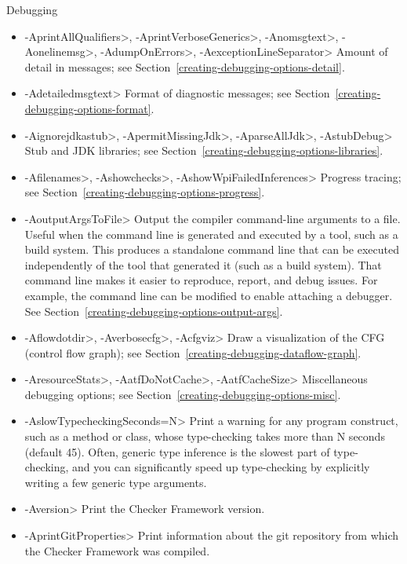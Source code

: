 Debugging
\begin{itemize}
\item
 \<-AprintAllQualifiers>,
 \<-AprintVerboseGenerics>,
 \<-Anomsgtext>,
 \<-Aonelinemsg>,
 \<-AdumpOnErrors>,
 \<-AexceptionLineSeparator>
Amount of detail in messages; see Section~\ref{creating-debugging-options-detail}.

\item
 \<-Adetailedmsgtext>
Format of diagnostic messages; see Section~\ref{creating-debugging-options-format}.

\item
 \<-Aignorejdkastub>,
 \<-ApermitMissingJdk>,
 \<-AparseAllJdk>,
 \<-AstubDebug>
Stub and JDK libraries; see Section~\ref{creating-debugging-options-libraries}.

\item
 \<-Afilenames>,
 \<-Ashowchecks>,
 \<-AshowWpiFailedInferences>
Progress tracing; see Section~\ref{creating-debugging-options-progress}.

\item
\<-AoutputArgsToFile>
Output the compiler command-line arguments to a file.  Useful when the
command line is generated and executed by a tool, such as a build system.
This produces a standalone command line that can be executed independently
of the tool that generated it (such as a build system).
That command line makes it easier to reproduce, report, and debug issues.
For example, the command line can be modified to enable attaching a debugger.
See Section~\ref{creating-debugging-options-output-args}.

\item
 \<-Aflowdotdir>,
 \<-Averbosecfg>,
 \<-Acfgviz>
 Draw a visualization of the CFG (control flow graph); see
 Section~\ref{creating-debugging-dataflow-graph}.

\item
 \<-AresourceStats>,
 \<-AatfDoNotCache>,
 \<-AatfCacheSize>
Miscellaneous debugging options; see Section~\ref{creating-debugging-options-misc}.

\item
 \<-AslowTypecheckingSeconds=N>
Print a warning for any program construct, such as a method or class, whose
type-checking takes more than N seconds (default 45).
Often, generic type inference is the slowest part of type-checking, and you
can significantly speed up type-checking by explicitly writing a few
generic type arguments.

\item
 \<-Aversion>
Print the Checker Framework version.

\item
 \<-AprintGitProperties>
Print information about the git repository from which the Checker Framework
was compiled.

\end{itemize}


